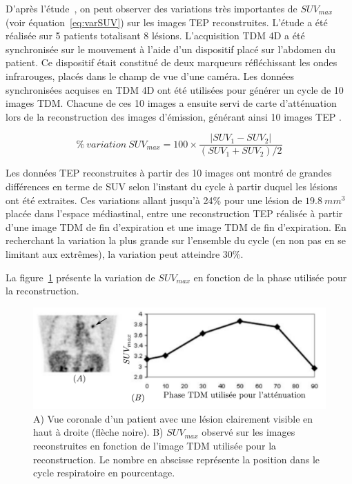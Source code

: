D'après l'étude~\cite{erdi2004ct}, on peut observer des variations très importantes de $SUV_{max}$ (voir équation~\ref{eq:varSUV}) sur les images TEP reconstruites. L'étude a été réalisée sur 5 patients totalisant 8 lésions. L'acquisition TDM 4D a été synchronisée sur le mouvement à l'aide d'un dispositif placé sur l'abdomen du patient. Ce dispositif était constitué de deux marqueurs réfléchissant les ondes infrarouges, placés dans le champ de vue d'une caméra. Les données synchronisées acquises en TDM 4D ont été utilisées pour générer un cycle de 10 images TDM. Chacune de ces 10 images a ensuite servi de carte d'atténuation lors de la reconstruction des images d'émission, générant ainsi 10 images TEP .

\begin{equation}
\label{eq:varSUV}
 \%~variation~SUV_{max} = 100 \times \frac{ | SUV_1 - SUV_2 | }{ (SUV_1 + SUV_2) / 2 }
\end{equation}


Les données TEP reconstruites à partir des 10 images ont montré de grandes différences en terme de SUV selon l'instant du cycle à partir duquel les lésions ont été extraites.
Ces variations allant jusqu'à 24\% pour une lésion de $19.8~mm^3$ placée dans l'espace médiastinal, entre une reconstruction TEP réalisée à partir d'une image TDM de fin d'expiration et une image TDM de fin d'expiration. En recherchant la variation la plus grande sur l'ensemble du cycle (en non pas en se limitant aux extrêmes), la variation peut atteindre 30\%.

La figure~\ref{fig:lesionEnFctPhaseTDM} présente la variation de $SUV_{max}$ en fonction de la phase utilisée pour la reconstruction.


\begin{figure}[h!]
	\vspace{0.5cm}
	\centering
			\includegraphics[width=12cm]{images/lesionEnFctPhaseTDM}
	\vspace{-0.5cm}
	\caption[Influence de l'influence de la carte d'atténuation sur l'activité des lésions] {A) Vue coronale d'un patient avec une lésion clairement visible en haut à droite (flèche noire).  B) $SUV_{max}$ observé sur les images reconstruites en fonction de l'image TDM utilisée pour la reconstruction. Le nombre en abscisse représente la position dans le cycle respiratoire en pourcentage.} 
	\label{fig:lesionEnFctPhaseTDM}
\end{figure}

